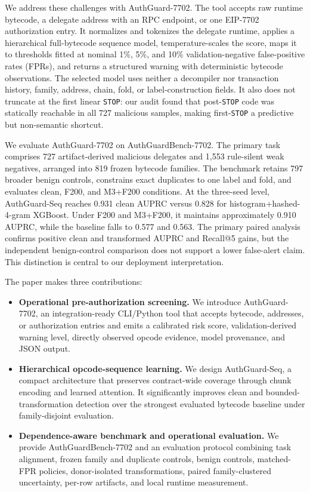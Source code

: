 \documentclass[conference]{IEEEtran}
\newcommand{\system}{AuthGuard-7702}
\newcommand{\model}{AuthGuard-Seq}
\newcommand{\bench}{AuthGuardBench-7702}
\newcommand{\code}[1]{\texttt{#1}}
\begin{document}
We address these challenges with \system. The tool accepts raw runtime bytecode, a delegate
address with an RPC endpoint, or one EIP-7702 authorization entry. It normalizes and tokenizes the
delegate runtime, applies a hierarchical full-bytecode sequence model, temperature-scales the
score, maps it to thresholds fitted at nominal 1\%, 5\%, and 10\% validation-negative
false-positive rates (FPRs), and returns a structured warning with deterministic bytecode
observations. The selected model uses neither a decompiler nor transaction history, family,
address, chain, fold, or label-construction fields. It also does not truncate at the first linear
\code{STOP}: our audit found that post-\code{STOP} code was statically reachable in all 727
malicious samples, making first-\code{STOP} a predictive but non-semantic shortcut.

We evaluate \system{} on \bench. The primary task comprises 727 artifact-derived malicious
delegates and 1,553 rule-silent weak negatives, arranged into 819 frozen bytecode families. The
benchmark retains 797 broader benign controls, constrains exact duplicates to one label and fold,
and evaluates clean, F200, and M3+F200 conditions. At the three-seed level, \model{} reaches 0.931
clean AUPRC versus 0.828 for histogram+hashed-4-gram XGBoost. Under F200 and M3+F200, it maintains
approximately 0.910 AUPRC, while the baseline falls to 0.577 and 0.563. The primary paired
analysis confirms positive clean and transformed AUPRC and Recall@5 gains, but the independent
benign-control comparison does not support a lower false-alert claim. This distinction is central
to our deployment interpretation.

The paper makes three contributions:
\begin{itemize}
  \item \textbf{Operational pre-authorization screening.} We introduce \system, an
  integration-ready CLI/Python tool that accepts bytecode, addresses, or authorization entries
  and emits a calibrated risk score, validation-derived warning level, directly observed opcode
  evidence, model provenance, and JSON output.
  \item \textbf{Hierarchical opcode-sequence learning.} We design \model, a compact architecture
  that preserves contract-wide coverage through chunk encoding and learned attention. It
  significantly improves clean and bounded-transformation detection over the strongest evaluated
  bytecode baseline under family-disjoint evaluation.
  \item \textbf{Dependence-aware benchmark and operational evaluation.} We provide \bench{} and
  an evaluation protocol combining task alignment, frozen family and duplicate controls, benign
  controls, matched-FPR policies, donor-isolated transformations, paired family-clustered
  uncertainty, per-row artifacts, and local runtime measurement.
\end{itemize}
\end{document}
